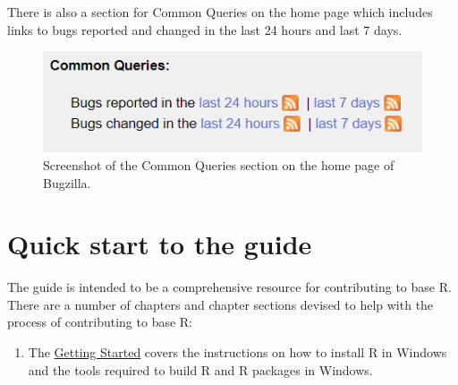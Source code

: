 \documentclass[
]{book}
\providecommand{\tightlist}{%
  \setlength{\itemsep}{0pt}\setlength{\parskip}{0pt}}
\begin{document}
There is also a section for Common Queries on the home page which includes links to bugs reported and changed in the last 24 hours and last 7 days.

\begin{figure}
\centering
\includegraphics{img/commonquery.png}
\caption{Screenshot of the Common Queries section on the home page of Bugzilla.}
\end{figure}

\hypertarget{quick-start-to-the-guide}{%
\section{Quick start to the guide}\label{quick-start-to-the-guide}}

The guide is intended to be a comprehensive resource for contributing to base R. There are a number of chapters and chapter sections devised to help with the process of contributing to base R:

\begin{enumerate}
\def\labelenumi{\arabic{enumi}.}
\tightlist
\item
  The \protect\hyperlink{GetStart}{Getting Started} covers the instructions on how to install R in Windows and the tools required to build R and R packages in Windows.
\end{enumerate}
\end{document}
